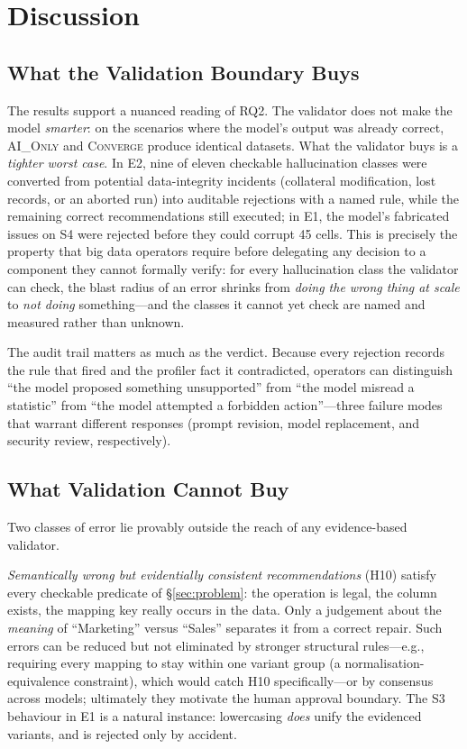 \section{Discussion}
\label{sec:discussion}
\subsection{What the Validation Boundary Buys}
The results support a nuanced reading of RQ2. The validator does not make the model \emph{smarter}: on the scenarios where the model's output was already correct, \textsc{AI\_Only} and \textsc{Converge} produce identical datasets. What the validator buys is a \emph{tighter worst case}. In E2, nine of eleven checkable hallucination classes were converted from potential data-integrity incidents (collateral modification, lost records, or an aborted run) into auditable rejections with a named rule, while the remaining correct recommendations still executed; in E1, the model's fabricated issues on S4 were rejected before they could corrupt 45 cells. This is precisely the property that big data operators require before delegating any decision to a component they cannot formally verify: for every hallucination class the validator can check, the blast radius of an error shrinks from \emph{doing the wrong thing at scale} to \emph{not doing} something---and the classes it cannot yet check are named and measured rather than unknown.

The audit trail matters as much as the verdict. Because every rejection records the rule that fired and the profiler fact it contradicted, operators can distinguish ``the model proposed something unsupported'' from ``the model misread a statistic'' from ``the model attempted a forbidden action''---three failure modes that warrant different responses (prompt revision, model replacement, and security review, respectively).

\subsection{What Validation Cannot Buy}
Two classes of error lie provably outside the reach of any evidence-based validator.

\emph{Semantically wrong but evidentially consistent recommendations} (H10) satisfy every checkable predicate of \S\ref{sec:problem}: the operation is legal, the column exists, the mapping key really occurs in the data. Only a judgement about the \emph{meaning} of ``Marketing'' versus ``Sales'' separates it from a correct repair. Such errors can be reduced but not eliminated by stronger structural rules---e.g., requiring every mapping to stay within one variant group (a normalisation-equivalence constraint), which would catch H10 specifically---or by consensus across models; ultimately they motivate the human approval boundary. The S3 behaviour in E1 is a natural instance: lowercasing \emph{does} unify the evidenced variants, and is rejected only by accident.

